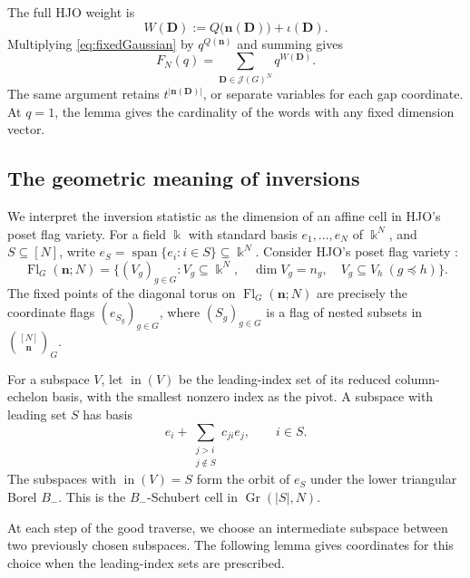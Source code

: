 \documentclass[12pt,reqno]{amsart}
\numberwithin{equation}{section}
\theoremstyle{definition}
\theoremstyle{remark}
\theoremstyle{plain}
\newcommand{\nn}{\mathbf n}
\begin{document}
The full HJO weight is
\begin{equation}\label{eq:wordgrading}
 W(\boldsymbol D):=Q\bigl(\nn(\boldsymbol D)\bigr)
                         +\iota(\boldsymbol D).
\end{equation}
Multiplying \eqref{eq:fixedGaussian} by $q^{Q(\nn)}$ and summing gives
\begin{equation}\label{eq:wordidentity}
 F_N(q)=\sum_{\boldsymbol D\in\mathcal J(G)^N}q^{W(\boldsymbol D)}.
\end{equation}
The same argument retains $t^{|\nn(\boldsymbol D)|}$, or separate
variables for each gap coordinate.  At $q=1$, the lemma gives the
cardinality of the words with any fixed dimension vector.

\subsection{The geometric meaning of inversions}\label{subsec:flaggeometry}
We interpret the inversion statistic as the dimension of an affine cell
in HJO's poset flag variety.  For a field $\Bbbk$ with standard basis $e_1,\ldots,e_N$ of $\Bbbk^N$, and $S\subseteq[N]$, write
$e_S=\operatorname{span}\{e_i:i\in S\}\subseteq\Bbbk^N$. Consider HJO's poset flag variety \cite[Sections~5--6]{HJO}:
\begin{equation}\label{eq:poset-flag}
 \operatorname{Fl}_G(\nn;N)=
 \{(V_g)_{g\in G}:V_g\subseteq\Bbbk^N,\quad
                   \dim V_g=n_g,\quad V_g\subseteq V_h\ (g\preceq h)\}.
\end{equation}
The fixed points of the diagonal torus on $\operatorname{Fl}_G(\nn;N)$ are precisely the coordinate flags  $(e_{S_g})_{g\in G}$, where $(S_g)_{g\in G}$ is a flag of nested subsets in $\binom{[N]}{\nn}_G$.

For a subspace $V$, let $\operatorname{in}(V)$ be the leading-index set
of its reduced column-echelon basis, with the smallest nonzero index
as the pivot.  A subspace with leading set $S$ has basis
\[
 e_i+\sum_{\substack{j>i\\j\notin S}}c_{ji}e_j,\qquad i\in S.
\]
The subspaces with $\operatorname{in}(V)=S$ form the orbit of $e_S$ under the lower triangular Borel $B_-$.  This is the $B_-$-Schubert cell in $\operatorname{Gr}(|S|,N)$. 

At each step of the good traverse, we choose an intermediate subspace
between two previously chosen subspaces.  The following lemma gives
coordinates for this choice when the leading-index sets are prescribed.
\end{document}
